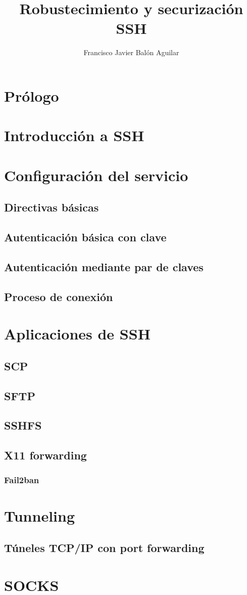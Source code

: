 \documentclass[a4paper, 11pt, titlepage]{article}
\title{Robustecimiento y securización SSH}
\author{Francisco Javier Balón Aguilar}
\begin{document}
\maketitle
\renewcommand{\contentsname}{Índice}
\tableofcontents
\newpage

\section*{Prólogo}
\newpage

\section{Introducción a SSH}
\section{Configuración del servicio}
    \subsection{Directivas básicas}
    \subsection{Autenticación básica con clave}
    \subsection{Autenticación mediante par de claves}
    \subsection{Proceso de conexión}
\section{Aplicaciones de SSH}
    \subsection{SCP}
    \subsection{SFTP}
    \subsection{SSHFS}
    \subsection{X11 forwarding}
    \subsubsection{Fail2ban}
\section{Tunneling}
    \subsection{Túneles TCP/IP con port forwarding}
\section{SOCKS}
\end{document}

